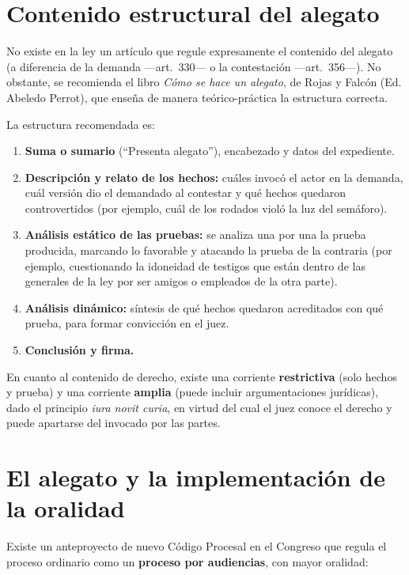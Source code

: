 \documentclass[12pt,oneside]{book}
\begin{document}
\section{Contenido estructural del alegato}

No existe en la ley un artículo que regule expresamente el contenido del alegato (a diferencia de la demanda ---art.~330--- o la contestación ---art.~356---). No obstante, se recomienda el libro \textit{Cómo se hace un alegato}, de Rojas y Falcón (Ed. Abeledo Perrot), que enseña de manera teórico-práctica la estructura correcta.

La estructura recomendada es:

\begin{enumerate}
    \item \textbf{Suma o sumario} (``Presenta alegato''), encabezado y datos del expediente.
    \item \textbf{Descripción y relato de los hechos:} cuáles invocó el actor en la demanda, cuál versión dio el demandado al contestar y qué hechos quedaron controvertidos (por ejemplo, cuál de los rodados violó la luz del semáforo).
    \item \textbf{Análisis estático de las pruebas:} se analiza una por una la prueba producida, marcando lo favorable y atacando la prueba de la contraria (por ejemplo, cuestionando la idoneidad de testigos que están dentro de las generales de la ley por ser amigos o empleados de la otra parte).
    \item \textbf{Análisis dinámico:} síntesis de qué hechos quedaron acreditados con qué prueba, para formar convicción en el juez.
    \item \textbf{Conclusión y firma.}
\end{enumerate}

En cuanto al contenido de derecho, existe una corriente \textbf{restrictiva} (solo hechos y prueba) y una corriente \textbf{amplia} (puede incluir argumentaciones jurídicas), dado el principio \textit{iura novit curia}, en virtud del cual el juez conoce el derecho y puede apartarse del invocado por las partes.

\section{El alegato y la implementación de la oralidad}

Existe un anteproyecto de nuevo Código Procesal en el Congreso que regula el proceso ordinario como un \textbf{proceso por audiencias}, con mayor oralidad:
\end{document}
